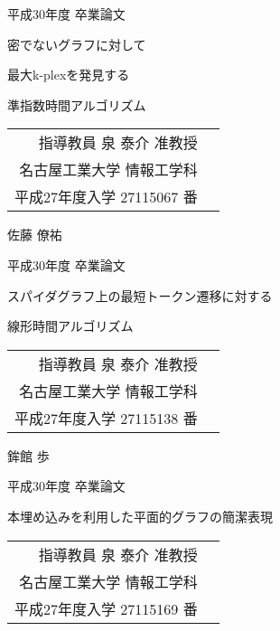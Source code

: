 \begin{titlepage}
\begin{center}
\noindent

{\Large 平成30年度 卒業論文}

\vspace{0.15cm}

{\LARGE 密でないグラフに対して}

{\LARGE 最大k-plexを発見する}

{\LARGE 準指数時間アルゴリズム}

{\Large 
\vspace{2cm}
\begin{tabular}{rl}
指導教員 泉 泰介 准教授 \\
名古屋工業大学 情報工学科 \\
平成27年度入学 27115067 番 
\end{tabular}}

{\LARGE 佐藤 僚祐}

\vspace*{2cm}
\noindent

{\Large 平成30年度 卒業論文}

\vspace{0.15cm}

{\LARGE スパイダグラフ上の最短トークン遷移に対する}

{\LARGE 線形時間アルゴリズム}


{\Large 
\vspace{2cm}
\begin{tabular}{rl}
指導教員 泉 泰介 准教授\\
名古屋工業大学 情報工学科\\
平成27年度入学 27115138 番
\end{tabular}}

{\LARGE 鉾館 歩}

\vspace*{2cm}
\noindent
\newpage


{\Large 平成30年度 卒業論文}

\vspace{0.15cm}

{\LARGE 本埋め込みを利用した平面的グラフの簡潔表現}

{\Large 
\vspace{2cm}
\begin{tabular}{rl}
指導教員 泉 泰介 准教授\\
名古屋工業大学 情報工学科\\
平成27年度入学 27115169 番
\end{tabular}}


\end{center}
\end{titlepage}
